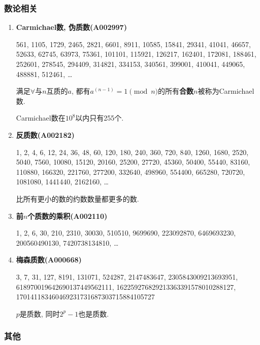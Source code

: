 \subsubsection{数论相关}

\begin{enumerate}

\item \textbf{Carmichael数, 伪质数(A002997)}

561, 1105, 1729, 2465, 2821, 6601, 8911, 10585, 15841, 29341, 41041, 46657, 52633, 62745, 63973, 75361, 101101, 115921, 126217, 162401, 172081, 188461, 252601, 278545, 294409, 314821, 334153, 340561, 399001, 410041, 449065, 488881, 512461, \dots

满足$\forall$与$n$互质的$a$, 都有$a ^ (n - 1) = 1 \pmod n$的所有\textbf{合数}$n$被称为Carmichael数.

Carmichael数在$10^8$以内只有255个.

\item \textbf{反质数(A002182)}

1, 2, 4, 6, 12, 24, 36, 48, 60, 120, 180, 240, 360, 720, 840, 1260, 1680, 2520, 5040, 7560, 10080, 15120, 20160, 25200, 27720, 45360, 50400, 55440, 83160, 110880, 166320, 221760, 277200, 332640, 498960, 554400, 665280, 720720, 1081080, 1441440, 2162160, \dots

比所有更小的数的约数数量都更多的数.

\item \textbf{前$n$个质数的乘积(A002110)}

1, 2, 6, 30, 210, 2310, 30030, 510510, 9699690, 223092870, 6469693230, 200560490130, 7420738134810, \dots

\item \textbf{梅森质数(A000668)}

3, 7, 31, 127, 8191, 131071, 524287, 2147483647, 2305843009213693951, 618970019642690137449562111, 162259276829213363391578010288127,\\170141183460469231731687303715884105727

$p$是质数, 同时$2^p - 1$也是质数.

\end{enumerate}

\subsubsection{其他}

